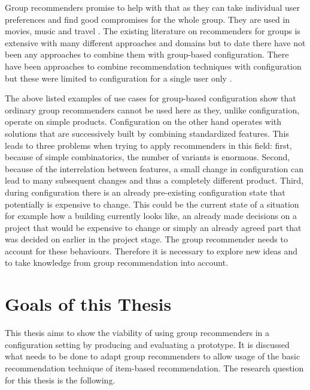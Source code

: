 Group recommenders promise to help with that as they can take individual user preferences and find good compromises for the whole group. They are used in movies, music and travel \cite{garciaGroupRecommenderSystem2009, piliponyte2013sequential, peraGroupRecommenderMovies2013,felfernigGroupRecommenderApplications2018}. The existing literature on recommenders for groups is extensive with many different approaches and domains \cite{delicResearchMethodsGroup2016, chenInterfaceInteractionDesign2011, atasItemRecommendationUsing2017, jamesonRecommendationGroups2007, chenEmpatheticonsDesigningEmotion2014, liuCGSPAComprehensiveGroup2019} but to date there have not been any approaches to combine them with group-based configuration. There have been approaches to combine recommendation techniques with configuration but these were limited to configuration for a single user only \cite{pereiraFeatureBasedPersonalizedRecommender2016, scholzConfigurationbasedRecommenderSystem2017, scholzEffectsDecisionSpace2017}.


The above listed examples of use cases for group-based configuration show that ordinary group recommenders cannot be used here as they, unlike configuration, operate on simple products. Configuration on the other hand operates with solutions that are successively built by combining standardized features. This leads to three problems when trying to apply recommenders in this field: first, because of simple combinatorics, the number of variants is enormous. Second, because of the interrelation between features, a small change in configuration can lead to many subsequent changes and thus a completely different product. Third, during configuration there is an already pre-existing configuration state that potentially is expensive to change. This could be the current state of a situation for example how a building currently looks like, an already made decisions on a project that would be expensive to change or simply an already agreed part that was decided on earlier in the project stage. The group recommender needs to account for these behaviours. Therefore it is necessary to explore new ideas and to take knowledge from group recommendation into account.

\section{Goals of this Thesis}
\label{sec:Introduction:Goals}

This thesis aims to show the viability of using group recommenders in a configuration setting by producing and evaluating a prototype. It is discussed what needs to be done to adapt group recommenders to allow usage of the basic recommendation technique of item-based recommendation. The research question for this thesis is the following.

